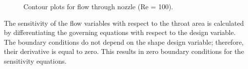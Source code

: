 \begin{figure}[H]
    \centering
    \quad
    \caption{Contour plots for flow through nozzle (Re = 100).}
    \label{fig:C4_nozzleFlow_contourForAnalysis}
\end{figure}
%
The sensitivity of the flow variables with respect to the throat area is calculated by differentiating the governing equations with respect to the design variable. The boundary conditions do not depend on the shape design variable; therefore, their derivative is equal to zero. This results in zero boundary conditions for the sensitivity equations.

